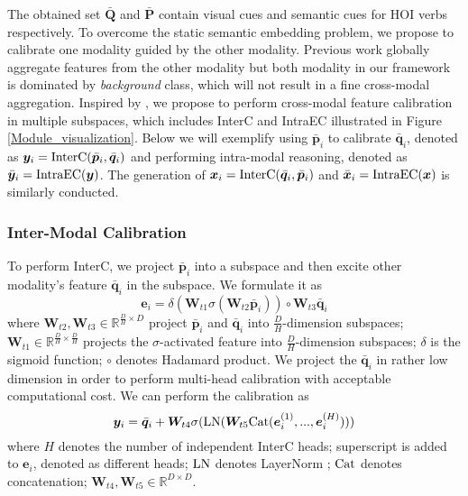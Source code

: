 \documentclass[letterpaper]{article} %
\begin{document}
The obtained set $\bar{\bm{Q}}$ and $\bar{\bm{P}}$ contain visual cues and semantic cues for HOI verbs respectively. To overcome the static semantic embedding problem, we propose to calibrate one modality guided by the other modality. Previous work globally aggregate features from the other modality \cite{Gao2019DynamicInterIntra} but both modality in our framework is dominated by \textit{background} class, which will not result in a fine cross-modal aggregation. Inspired by \cite{hu2018SENet,AttentionAlluNeed}, we propose to perform cross-modal feature calibration in multiple subspaces, which includes InterC and IntraEC illustrated in Figure \ref{Module_visualization}. Below we will exemplify using $\bar{\bm{p}}_i$ to calibrate $\bar{\bm{q}}_i$, denoted as $\bm{y}_i = {\rm InterC}(\bar{\bm{p}}_i, \bar{\bm{q}}_i)$ and performing intra-modal reasoning, denoted as $\bar{\bm{y}}_i = {\rm IntraEC}(\bm{y})$. The generation of $\bm{x}_i = {\rm InterC}(\bar{\bm{q}}_i, \bar{\bm{p}}_i)$ and $\bar{\bm{x}}_i = {\rm IntraEC}(\bm{x})$ is similarly conducted.


\subsubsection{Inter-Modal Calibration} To perform InterC, we project $\bar{\bm{p}}_i$ into a subspace and then excite other modality's feature $\bar{\bm{q}}_i$ in the subspace. We formulate it as 
\begin{equation}
     \bm{e}_{i} = \delta(\bm{W}_{t1} \sigma(\bm{W}_{t2} \bar{\bm{p}}_i)) \circ \bm{W}_{t3} \bar{\bm{q}}_i 
\end{equation}
where $\bm{W}_{t2},\bm{W}_{t3} \in \mathbb{R}^{\frac{D}{H} \times D}$ project $\bar{\bm{p}}_i$ and $\bar{\bm{q}}_i$ into $\frac{D}{H}$-dimension subspaces; $\bm{W}_{t1} \in \mathbb{R}^{\frac{D}{H} \times \frac{D}{H}}$ projects the $\sigma$-activated feature into $\frac{D}{H}$-dimension subspaces; $\delta$ is the sigmoid function; $\circ$ denotes Hadamard product. We project the $\bar{\bm{q}}_i$ in rather low dimension in order to perform multi-head calibration with acceptable computational cost. We can perform the calibration as
\begin{equation}
    \bm{y}_i = \bar{\bm{q}}_i + \bm{W}_{t4} \sigma({\rm LN}(\bm{W}_{t5} {\rm Cat}(\bm{e}_{i}^{(1)},...,\bm{e}_{i}^{(H)})))
\end{equation}
where $H$ denotes the number of independent InterC heads; superscript is added to $\bm{e}_{i}$, denoted as different heads; ${\rm LN}$ denotes LayerNorm \cite{ba2016layernorm}; ${\rm Cat}$ denotes concatenation; $\bm{W}_{t4},\bm{W}_{t5} \in \mathbb{R}^{D \times D}$.
\end{document}
